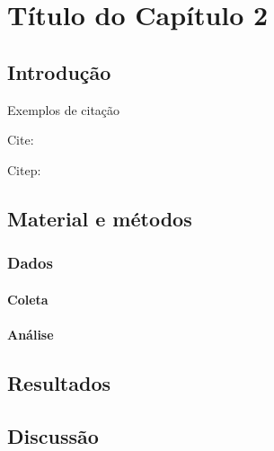 %
%

\chapter{Título do Capítulo 2}

\section{Introdução}

Exemplos de citação

Cite: \cite{scheiner_general_2008}

Citep: \citep{scheiner_general_2008}

\section{Material e métodos}

\subsection{Dados}

\subsubsection{Coleta}

\subsubsection{Análise}

\section{Resultados}

\section{Discussão}

%
%

%
